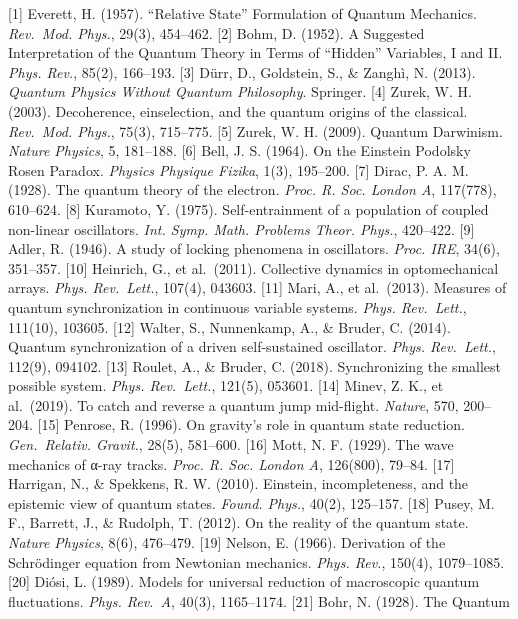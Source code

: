\documentclass[
]{article}
\begin{document}
{[}1{]} Everett, H. (1957). ``Relative State'' Formulation of Quantum
Mechanics. \emph{Rev.~Mod. Phys.}, 29(3), 454--462. {[}2{]} Bohm, D.
(1952). A Suggested Interpretation of the Quantum Theory in Terms of
``Hidden'' Variables, I and II. \emph{Phys. Rev.}, 85(2), 166--193.
{[}3{]} Dürr, D., Goldstein, S., \& Zanghì, N. (2013). \emph{Quantum
Physics Without Quantum Philosophy}. Springer. {[}4{]} Zurek, W. H.
(2003). Decoherence, einselection, and the quantum origins of the
classical. \emph{Rev.~Mod. Phys.}, 75(3), 715--775. {[}5{]} Zurek, W. H.
(2009). Quantum Darwinism. \emph{Nature Physics}, 5, 181--188. {[}6{]}
Bell, J. S. (1964). On the Einstein Podolsky Rosen Paradox.
\emph{Physics Physique Fizika}, 1(3), 195--200. {[}7{]} Dirac, P. A. M.
(1928). The quantum theory of the electron. \emph{Proc. R. Soc. London
A}, 117(778), 610--624. {[}8{]} Kuramoto, Y. (1975). Self-entrainment of
a population of coupled non-linear oscillators. \emph{Int. Symp. Math.
Problems Theor. Phys.}, 420--422. {[}9{]} Adler, R. (1946). A study of
locking phenomena in oscillators. \emph{Proc. IRE}, 34(6), 351--357.
{[}10{]} Heinrich, G., et al.~(2011). Collective dynamics in
optomechanical arrays. \emph{Phys. Rev.~Lett.}, 107(4), 043603. {[}11{]}
Mari, A., et al.~(2013). Measures of quantum synchronization in
continuous variable systems. \emph{Phys. Rev.~Lett.}, 111(10), 103605.
{[}12{]} Walter, S., Nunnenkamp, A., \& Bruder, C. (2014). Quantum
synchronization of a driven self-sustained oscillator. \emph{Phys.
Rev.~Lett.}, 112(9), 094102. {[}13{]} Roulet, A., \& Bruder, C. (2018).
Synchronizing the smallest possible system. \emph{Phys. Rev.~Lett.},
121(5), 053601. {[}14{]} Minev, Z. K., et al.~(2019). To catch and
reverse a quantum jump mid-flight. \emph{Nature}, 570, 200--204.
{[}15{]} Penrose, R. (1996). On gravity's role in quantum state
reduction. \emph{Gen.~Relativ. Gravit.}, 28(5), 581--600. {[}16{]} Mott,
N. F. (1929). The wave mechanics of α-ray tracks. \emph{Proc. R. Soc.
London A}, 126(800), 79--84. {[}17{]} Harrigan, N., \& Spekkens, R. W.
(2010). Einstein, incompleteness, and the epistemic view of quantum
states. \emph{Found. Phys.}, 40(2), 125--157. {[}18{]} Pusey, M. F.,
Barrett, J., \& Rudolph, T. (2012). On the reality of the quantum state.
\emph{Nature Physics}, 8(6), 476--479. {[}19{]} Nelson, E. (1966).
Derivation of the Schrödinger equation from Newtonian mechanics.
\emph{Phys. Rev.}, 150(4), 1079--1085. {[}20{]} Diósi, L. (1989). Models
for universal reduction of macroscopic quantum fluctuations. \emph{Phys.
Rev.~A}, 40(3), 1165--1174. {[}21{]} Bohr, N. (1928). The Quantum
\end{document}

